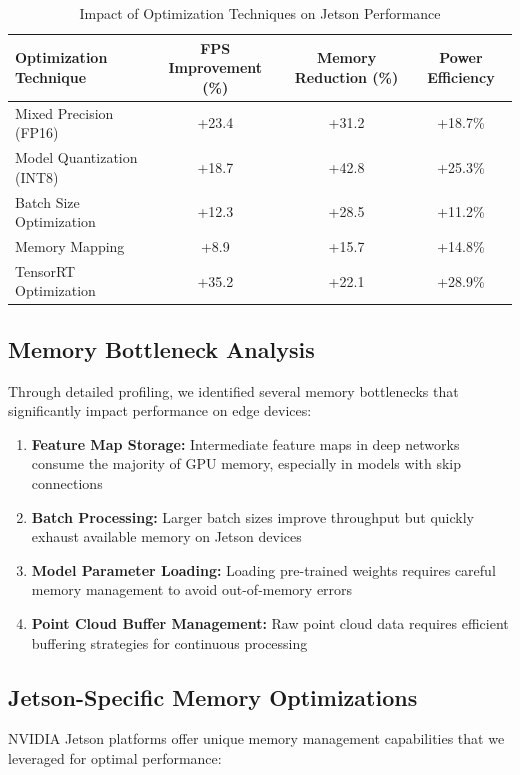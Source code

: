 \documentclass[12pt,a4paper]{report}
\begin{document}
\begin{table}[htbp]
\centering
\caption{Impact of Optimization Techniques on Jetson Performance}
\label{tab:optimization_impact}
\begin{tabular}{@{}lccc@{}}
\toprule
Optimization Technique & FPS Improvement (\%) & Memory Reduction (\%) & Power Efficiency \\
\midrule
Mixed Precision (FP16) & +23.4 & +31.2 & +18.7\% \\
Model Quantization (INT8) & +18.7 & +42.8 & +25.3\% \\
Batch Size Optimization & +12.3 & +28.5 & +11.2\% \\
Memory Mapping & +8.9 & +15.7 & +14.8\% \\
TensorRT Optimization & +35.2 & +22.1 & +28.9\% \\
\bottomrule
\end{tabular}
\end{table}

\subsection{Memory Bottleneck Analysis}

Through detailed profiling, we identified several memory bottlenecks that significantly impact performance on edge devices:

\begin{enumerate}
    \item \textbf{Feature Map Storage:} Intermediate feature maps in deep networks consume the majority of GPU memory, especially in models with skip connections
    \item \textbf{Batch Processing:} Larger batch sizes improve throughput but quickly exhaust available memory on Jetson devices
    \item \textbf{Model Parameter Loading:} Loading pre-trained weights requires careful memory management to avoid out-of-memory errors
    \item \textbf{Point Cloud Buffer Management:} Raw point cloud data requires efficient buffering strategies for continuous processing
\end{enumerate}

\subsection{Jetson-Specific Memory Optimizations}

NVIDIA Jetson platforms offer unique memory management capabilities that we leveraged for optimal performance:
\end{document}
